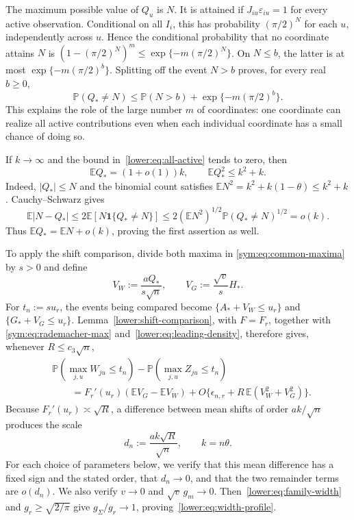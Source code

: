 \documentclass[11pt,letterpaper,twoside,leqno]{article}
\theoremstyle{bookplain}
\theoremstyle{bookremark}
\newcommand{\E}{\mathbb E}
\newcommand{\Pp}{\mathbb P}
\newcommand{\ind}{\mathbf 1}
\begin{document}
The maximum possible value of $Q_u$ is $N$. It is attained if
$J_{iu}\varepsilon_{iu}=1$ for every active observation.
Conditional on all $I_i$, this has probability $(\pi/2)^N$
for each $u$, independently across $u$. Hence the conditional
probability that no coordinate attains $N$ is
$(1-(\pi/2)^N)^m\le\exp\{-m(\pi/2)^N\}$.
On $N\le b$, the latter is at most $\exp\{-m(\pi/2)^b\}$.
Splitting off the event $N>b$ proves, for every real $b\ge0$,
\begin{equation}
 \Pp(Q_*\ne N)\le\Pp(N>b)+\exp\{-m(\pi/2)^b\}.
 \label{lower:eq:all-active}
\end{equation}
This explains the role of the large number $m$ of coordinates:
one coordinate can realize all active contributions even when
each individual coordinate has a small chance of doing so.

If $k\to\infty$ and the bound in~\eqref{lower:eq:all-active}
tends to zero, then
\begin{equation}
 \E Q_*=(1+o(1))k,\qquad \E Q_*^2\le k^2+k.
 \label{lower:eq:activation-moments}
\end{equation}
Indeed, $|Q_*|\le N$ and the binomial count satisfies
$\E N^2=k^2+k(1-\theta)\le k^2+k$. Cauchy--Schwarz gives
\[
 \E|N-Q_*|
 \le2\E[N\ind\{Q_*\ne N\}]
 \le2(\E N^2)^{1/2}\Pp(Q_*\ne N)^{1/2}=o(k).
\]
Thus $\E Q_*=\E N+o(k)$, proving the first assertion as well.

To apply the shift comparison, divide both maxima in
\eqref{sym:eq:common-maxima} by $s>0$ and define
\[
 V_W:=\frac{aQ_*}{s\sqrt n},\qquad V_G:=\frac{\sqrt v}{s}H_*.
\]
For $t_n:=su_r$, the events being compared become
$\{A_*+V_W\le u_r\}$ and $\{G_*+V_G\le u_r\}$.
Lemma~\ref{lower:shift-comparison}, with $F=F_r$, together with
\eqref{sym:eq:rademacher-max} and~\eqref{lower:eq:leading-density},
therefore gives, whenever $R\le c_3\sqrt n$,
\begin{equation}
\begin{split}
 &\Pp(\max_{j,u}W_{ju}\le t_n)-\Pp(\max_{j,u}Z_{ju}\le t_n)\\
 &\qquad=F_r'(u_r)(\E V_G-\E V_W)
       +O\{\epsilon_{n,r}+R\,\E(V_W^2+V_G^2)\}.
\end{split}
 \label{lower:eq:master-comparison}
\end{equation}
Because $F_r'(u_r)\asymp\sqrt R$, a difference between mean
shifts of order $ak/\sqrt n$ produces the scale
\begin{equation}
 d_n:=\frac{ak\sqrt R}{\sqrt n},\qquad k=n\theta.
 \label{lower:eq:proof-scale}
\end{equation}
For each choice of parameters below, we verify that this mean
difference has a fixed sign and the stated order, that $d_n\to0$,
and that the two remainder terms are $o(d_n)$.
We also verify $v\to0$ and $\sqrt v\,g_m\to0$.
Then~\eqref{lower:eq:family-width} and $g_r\ge\sqrt{2/\pi}$
give $g_\Sigma/g_r\to1$, proving~\eqref{lower:eq:width-profile}.
\end{document}
